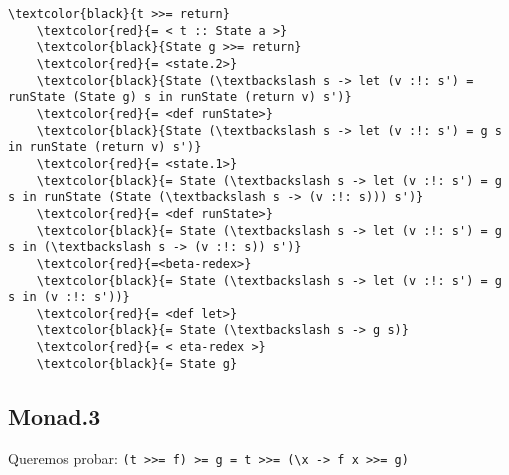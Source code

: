 \documentclass[11pt]{article}
\begin{document}
\begin{Verbatim}[commandchars=\\\{\}]
    \textcolor{black}{t >>= return}
    \textcolor{red}{= < t :: State a >}
    \textcolor{black}{State g >>= return}
    \textcolor{red}{= <state.2>}
    \textcolor{black}{State (\textbackslash s -> let (v :!: s') = runState (State g) s in runState (return v) s')}
    \textcolor{red}{= <def runState>}
    \textcolor{black}{State (\textbackslash s -> let (v :!: s') = g s in runState (return v) s')}
    \textcolor{red}{= <state.1>}
    \textcolor{black}{= State (\textbackslash s -> let (v :!: s') = g s in runState (State (\textbackslash s -> (v :!: s))) s')}
    \textcolor{red}{= <def runState>}
    \textcolor{black}{= State (\textbackslash s -> let (v :!: s') = g s in (\textbackslash s -> (v :!: s)) s')}
    \textcolor{red}{=<beta-redex>}
    \textcolor{black}{= State (\textbackslash s -> let (v :!: s') = g s in (v :!: s'))}
    \textcolor{red}{= <def let>}
    \textcolor{black}{= State (\textbackslash s -> g s)}
    \textcolor{red}{= < eta-redex >}
    \textcolor{black}{= State g}
\end{Verbatim}

\subsection*{Monad.3}

Queremos probar: \texttt{(t >>= f) >= g   = t >>= (\textbackslash x -> f x >>= g)}
\end{document}
